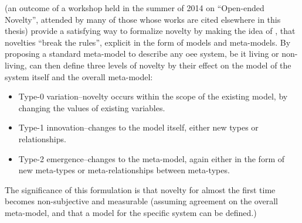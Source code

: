 \Cite{BanzhafBaumgaertnerBeslonEtAl2016} (an outcome of a workshop held in the summer of 2014 on ``Open-ended Novelty'', attended by many of those whose works are cited elsewhere in this thesis) provide a satisfying way to formalize novelty by making the idea of \cite{Boden2004}, that novelties ``break the rules'', explicit in the form of models and meta-models. By proposing a standard meta-model to describe any \gls{oee} system, be it living or non-living, \cite{BanzhafBaumgaertnerBeslonEtAl2016} can then define three levels of novelty by their effect on the model of the system itself and the overall meta-model:

\begin{itemize}
	\item Type-0 variation--novelty occurs within the scope of the existing model, by changing the values of existing variables.
	\item Type-1 innovation--changes to the model itself, either new types or relationships.
	\item Type-2 emergence--changes to the meta-model, again either in the form of new meta-types or meta-relationships between meta-types.
\end{itemize}
	
The significance of this formulation is that novelty for almost the first time becomes non-subjective and measurable (assuming agreement on the overall meta-model, and that a model for the specific system can be defined.)

